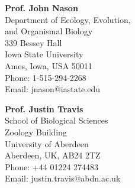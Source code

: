 \documentclass[letterpaper]{article}
\def\footerlink{http://bradduthie.github.io/DuthieCV.pdf}
\renewenvironment{itemize}{
  \begin{list}{}{
    \setlength{\leftmargin}{1.5em}
  }
}{
  \end{list}
}
\begin{document}
\begin{minipage}{0.5\linewidth}

\begin{itemize}

\newline
\item {\bf Prof. John Nason} \\
Department of Ecology, Evolution, \\ and Organismal Biology \\
339 Bessey Hall \\
Iowa State University \\
Ames, Iowa, USA 50011 \\
Phone: 1-515-294-2268 \\
Email: jnason@iastate.edu

\item {\bf Prof. Justin Travis} \\
School of Biological Sciences \\
Zoology Building \\
University of Aberdeen \\
Aberdeen, UK, AB24 2TZ \\
Phone: +44 01224 274483 \\
Email: justin.travis@abdn.ac.uk \\



\end{itemize}

\end{minipage}

\bigskip

\end{document}
